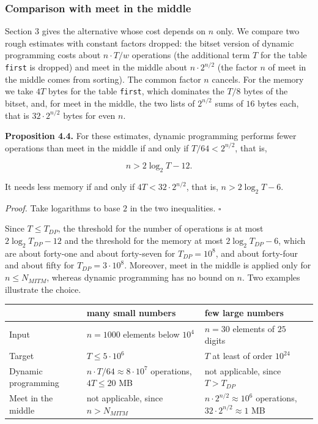 \documentclass[
]{article}
\begin{document}
\hypertarget{comparison-with-meet-in-the-middle}{%
\subsubsection{Comparison with meet in the
middle}\label{comparison-with-meet-in-the-middle}}

Section 3 gives the alternative whose cost depends on \(n\) only. We
compare two rough estimates with constant factors dropped: the bitset
version of dynamic programming costs about \(n \cdot T/w\) operations
(the additional term \(T\) for the table \texttt{first} is dropped) and
meet in the middle about \(n \cdot 2^{n/2}\) (the factor \(n\) of meet
in the middle comes from sorting). The common factor \(n\) cancels. For
the memory we take \(4T\) bytes for the table \texttt{first}, which
dominates the \(T/8\) bytes of the bitset, and, for meet in the middle,
the two lists of \(2^{n/2}\) sums of \(16\) bytes each, that is
\(32 \cdot 2^{n/2}\) bytes for even \(n\).

\textbf{Proposition 4.4.} For these estimates, dynamic programming
performs fewer operations than meet in the middle if and only if
\(T/64 < 2^{n/2}\), that is,

\[
n > 2 \log_2 T - 12 .
\]

It needs less memory if and only if \(4T < 32 \cdot 2^{n/2}\), that is,
\(n > 2 \log_2 T - 6\).

\emph{Proof.} Take logarithms to base \(2\) in the two inequalities.
\(\square\)

Since \(T \le T_{DP}\), the threshold for the number of operations is at
most \(2 \log_2 T_{DP} - 12\) and the threshold for the memory at most
\(2 \log_2 T_{DP} - 6\), which are about forty-one and about forty-seven
for \(T_{DP} = 10^{8}\), and about forty-four and about fifty for
\(T_{DP} = 3 \cdot 10^{8}\). Moreover, meet in the middle is applied
only for \(n \le N_{MITM}\), whereas dynamic programming has no bound on
\(n\). Two examples illustrate the choice.

\begin{longtable}[]{@{}>{\raggedright\arraybackslash}p{}>{\raggedright\arraybackslash}p{}>{\raggedright\arraybackslash}p{}@{}}
\toprule
 & many small numbers & few large numbers \\
\midrule
\endhead
Input & \(n = 1000\) elements below \(10^4\) & \(n = 30\) elements of \(25\) digits \\
\midrule
Target & \(T \le 5 \cdot 10^6\) & \(T\) at least of order \(10^{24}\) \\
\midrule
Dynamic programming & \(n \cdot T/64 \approx 8 \cdot 10^7\) operations, \(4T \le 20\) MB & not applicable, since \(T > T_{DP}\) \\
\midrule
Meet in the middle & not applicable, since \(n > N_{MITM}\) & \(n \cdot 2^{n/2} \approx 10^6\) operations,
\(32 \cdot 2^{n/2} \approx 1\) MB \\
\bottomrule
\end{longtable}
\end{document}
